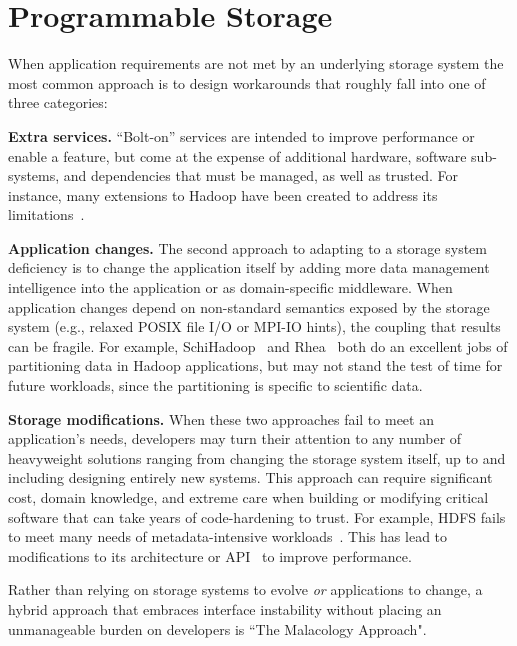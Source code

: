 \section{Programmable Storage}
\label{sec:progly}

When application requirements are not met by an underlying storage system the
most common approach is to design workarounds that roughly fall into one
of three categories:

{\bf Extra services.} ``Bolt-on'' services are intended to improve performance
or enable a feature, but come at the expense of additional hardware, software
sub-systems, and dependencies that must be managed, as well as trusted.
For instance, many extensions to Hadoop have been created to address its
limitations~\cite{bu:vldb2010-haloop, ekanayake:hpdc2010-twister,
ekanayake:escience2008-eglmapreduce, mihailescu:hotstorage2012-mixapart}.

{\bf Application changes.} The second approach to adapting to a storage system
deficiency is to change the application itself by adding more data management
intelligence into the application or as domain-specific middleware. When
application changes depend on non-standard semantics exposed by the storage
system (e.g., relaxed POSIX file I/O or MPI-IO hints), the coupling that results
can be fragile.
For example, SchiHadoop~\cite{buck:hpc2011-scihadoop} and Rhea~\cite{gkantsidis:nsdi2013-rhea} both do
an excellent jobs of partitioning data in Hadoop applications, but may not
stand the test of time for future workloads, since the partitioning is
specific to scientific data.

{\bf Storage modifications.} When these two approaches fail to meet an
application's needs, developers may turn their attention to any number of
heavyweight solutions ranging from changing the storage system itself, up to
and including designing entirely new systems. This approach can require
significant cost, domain knowledge, and extreme care when building or
modifying critical software that can take years of code-hardening to trust.
For example, HDFS fails to meet many needs 
of metadata-intensive workloads~\cite{shvachko:login2012-hdfs-scalability}.
This has lead to modifications to its architecture or
API~\cite{balmin:sigmod2012-clydesdale} to improve performance.

Rather than relying on storage systems to evolve \emph{or} applications to
change, a hybrid approach that embraces interface instability without placing
an unmanageable burden on developers is ``The Malacology Approach".

